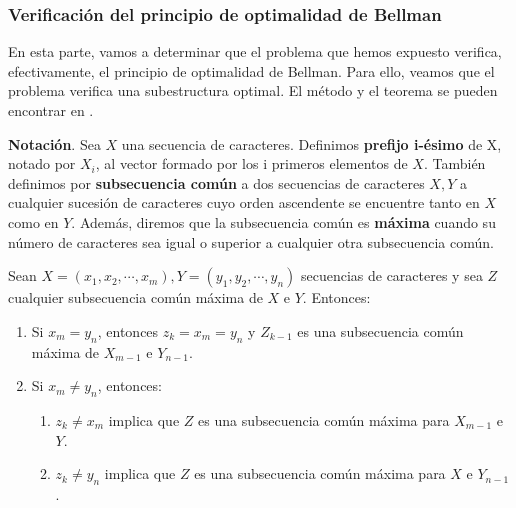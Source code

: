 \subsubsection{Verificación del principio de optimalidad de Bellman}

En esta parte, vamos a determinar que el problema que hemos expuesto verifica,
efectivamente, el principio de optimalidad de Bellman. Para ello, veamos que el
problema verifica una subestructura optimal. El método y el teorema se pueden encontrar
en \cite{Cormen2017}. 

\textbf{Notación}. Sea $X$ una secuencia de caracteres. Definimos \textbf{prefijo i-ésimo}
de X, notado por $X_i$, al vector formado por los i primeros elementos de $X$. 
También definimos por \textbf{subsecuencia común} a dos secuencias de caracteres $X,Y$ a cualquier sucesión de caracteres
cuyo orden ascendente se encuentre tanto en $X$ como en $Y$. Además, diremos que la
subsecuencia común es \textbf{máxima} cuando su número de caracteres sea igual o superior 
a cualquier otra subsecuencia común. 

\begin{theorem}
    Sean $X=(x_1,x_2,\cdots, x_m),Y=(y_1,y_2, \cdots, y_n)$ secuencias de caracteres 
    y sea $Z$ cualquier subsecuencia común máxima 
    de $X$ e $Y$. Entonces:
    \begin{enumerate}
      \item Si $x_m = y_n$, entonces $z_k = x_m = y_n$ y $Z_{k-1}$ es una subsecuencia
      común máxima de $X_{m-1}$ e $Y_{n-1}$. 
      \item Si $x_m \neq y_n$, entonces:
      \begin{enumerate}
        \item $z_k \neq x_m$ implica que $Z$ es una subsecuencia común máxima para $X_{m-1}$ e $Y$. 
        \item $z_k \neq y_n$ implica que $Z$ es una subsecuencia común máxima para $X$ e $Y_{n-1}$. 
      \end{enumerate}
    \end{enumerate}
\end{theorem}

